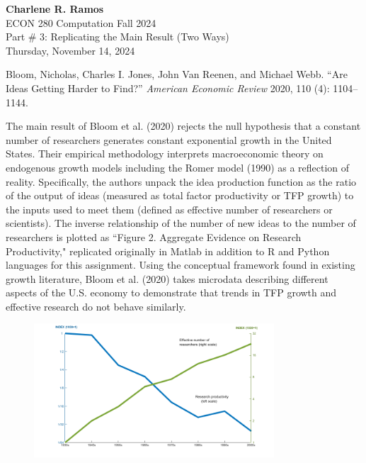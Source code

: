 \documentclass[11pt]{amsart}
\begin{document}
\noindent
{\textbf{\color{blue}Charlene R. Ramos}}\\
ECON 280 Computation Fall 2024\\
Part \# 3: Replicating the Main Result (Two Ways)\\
Thursday, November 14, 2024\\

\smallskip 

\noindent Bloom, Nicholas, Charles I. Jones, John Van Reenen, and Michael Webb. ``Are Ideas Getting Harder to Find?'' \emph{American Economic Review} 2020, 110 (4): 1104–1144.\\ 


\smallskip

\noindent The main result of Bloom et al. (2020) rejects the null hypothesis that a constant number of researchers generates constant exponential growth in the United States. Their empirical methodology interprets macroeconomic theory on endogenous growth models including the Romer model (1990) as a reflection of reality. Specifically, the authors unpack the idea production function as the ratio of the output of ideas (measured as total factor productivity or TFP growth) to the inputs used to meet them (defined as effective number of researchers or scientists). The inverse relationship of the number of new ideas to the number of researchers is plotted as ``Figure 2. Aggregate Evidence on Research Productivity," replicated originally in Matlab in addition to R and Python languages for this assignment. Using the conceptual framework found in existing growth literature, Bloom et al. (2020) takes microdata describing different aspects of the U.S. economy to demonstrate that trends in TFP growth and effective research do not behave similarly. 

\bigskip


\smallskip

\begin{figure}[h]
    \centering 
    \includegraphics[width=0.8\textwidth]{main_result_matlab.png}  
    \label{fig:histogram} 
\end{figure}
\end{document}
